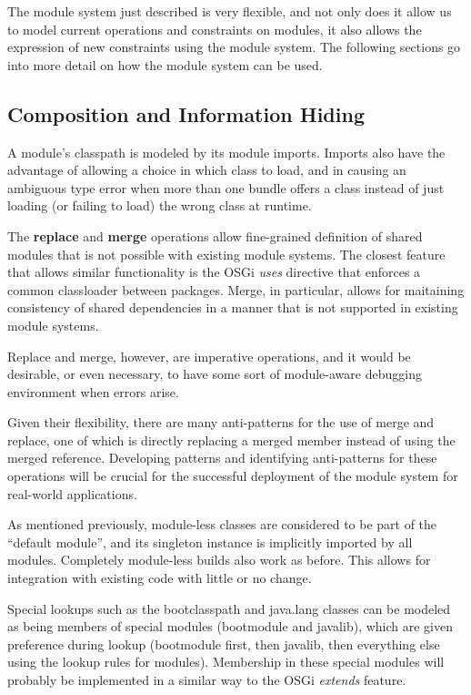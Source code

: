 The module system just described is very flexible, and not only does it
allow us to model current operations and constraints on modules, it also
allows the expression of new constraints using the module system. The following
sections go into more detail on how the module system can be used.

\subsection{Composition and Information Hiding}

A module's classpath is modeled by its module imports. Imports also have the advantage
of allowing a choice in which class to load, and in causing an
ambiguous type error  when more than one bundle offers
a class instead of just loading (or failing to load) the wrong class at runtime.

The \textbf{replace} and \textbf{merge} operations allow fine-grained
definition of shared modules that is not possible with existing
module systems. The closest feature that allows similar functionality
is the OSGi \textit{uses} directive that enforces a common classloader
between packages. Merge, in particular, allows for maitaining consistency
of shared dependencies in a manner that is not supported in existing
module systems.

Replace and merge, however, are imperative operations, and it would
be desirable, or even necessary, to have some sort of module-aware 
debugging environment when errors arise. 

Given their flexibility,
there are many anti-patterns for the use of merge and replace, one of which
is directly replacing a merged member instead of using the merged reference.
Developing patterns and identifying anti-patterns for these operations will be
crucial for the successful deployment of the module system for real-world applications.

As mentioned previously, module-less classes are considered to be part 
of the ``default module'', and its singleton instance is implicitly 
imported by all modules. Completely module-less builds also work as before.
This allows for integration with existing code with little or no change.

Special lookups such as the bootclasspath and java.lang classes can be
modeled as being members of special modules (bootmodule and javalib), 
which are given preference during lookup (bootmodule first, then javalib,
then everything else using the lookup rules for modules). Membership
in these special modules will probably be implemented in a similar way to
the OSGi \textit{extends} feature.

